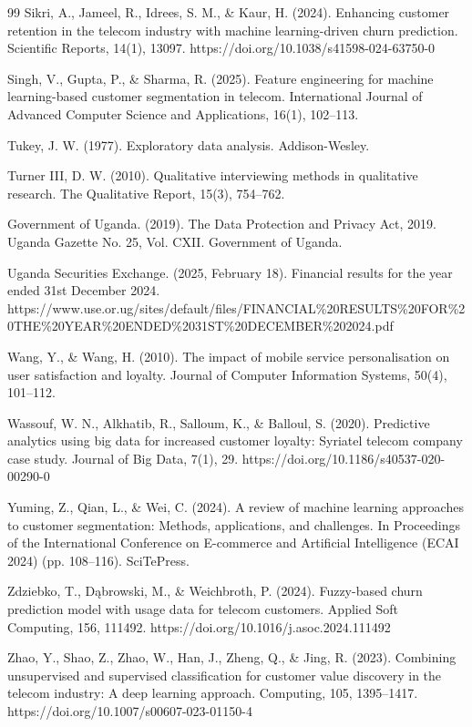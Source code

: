 \begin{thebibliography}{99}
Sikri, A., Jameel, R., Idrees, S. M., \& Kaur, H. (2024). Enhancing customer retention in the telecom industry with machine learning-driven churn prediction. Scientific Reports, 14(1), 13097. https://doi.org/10.1038/s41598-024-63750-0

Singh, V., Gupta, P., \& Sharma, R. (2025). Feature engineering for machine learning-based customer segmentation in telecom. International Journal of Advanced Computer Science and Applications, 16(1), 102--113.

Tukey, J. W. (1977). Exploratory data analysis. Addison-Wesley.

Turner III, D. W. (2010). Qualitative interviewing methods in qualitative research. The Qualitative Report, 15(3), 754--762.

Government of Uganda. (2019). The Data Protection and Privacy Act, 2019. Uganda Gazette No. 25, Vol. CXII. Government of Uganda.

Uganda Securities Exchange. (2025, February 18). Financial results for the year ended 31st December 2024. https://www.use.or.ug/sites/default/files/FINANCIAL\%20RESULTS\%20FOR\%20THE\%20YEAR\%20ENDED\%2031ST\%20DECEMBER\%202024.pdf

Wang, Y., \& Wang, H. (2010). The impact of mobile service personalisation on user satisfaction and loyalty. Journal of Computer Information Systems, 50(4), 101--112.

Wassouf, W. N., Alkhatib, R., Salloum, K., \& Balloul, S. (2020). Predictive analytics using big data for increased customer loyalty: Syriatel telecom company case study. Journal of Big Data, 7(1), 29. https://doi.org/10.1186/s40537-020-00290-0

Yuming, Z., Qian, L., \& Wei, C. (2024). A review of machine learning approaches to customer segmentation: Methods, applications, and challenges. In Proceedings of the International Conference on E-commerce and Artificial Intelligence (ECAI 2024) (pp. 108--116). SciTePress.

Zdziebko, T., Dąbrowski, M., \& Weichbroth, P. (2024). Fuzzy-based churn prediction model with usage data for telecom customers. Applied Soft Computing, 156, 111492. https://doi.org/10.1016/j.asoc.2024.111492

Zhao, Y., Shao, Z., Zhao, W., Han, J., Zheng, Q., \& Jing, R. (2023). Combining unsupervised and supervised classification for customer value discovery in the telecom industry: A deep learning approach. Computing, 105, 1395--1417. https://doi.org/10.1007/s00607-023-01150-4


\end{thebibliography}
